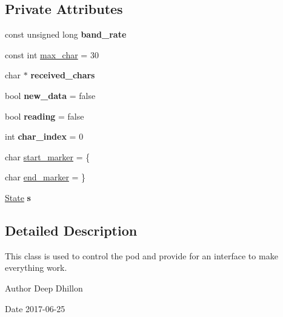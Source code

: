 \subsection*{Private Attributes}
\begin{DoxyCompactItemize}
\item 
\mbox{\label{class_controller_a89b2557ac09f4f69072d2bc92783ba27}} 
const unsigned long {\bfseries band\+\_\+rate}
\item 
const int \hyperlink{class_controller_a5dc336008413ea41127c35433ddb0a5c}{max\+\_\+char} = 30
\item 
\mbox{\label{class_controller_ac646097693f643bafe9abfe72242c95f}} 
char $\ast$ {\bfseries received\+\_\+chars}
\item 
\mbox{\label{class_controller_a77cb6176258765bd019e6ace99a0294a}} 
bool {\bfseries new\+\_\+data} = false
\item 
\mbox{\label{class_controller_a00cc042a5e81aff2fc6324cc6babca3c}} 
bool {\bfseries reading} = false
\item 
\mbox{\label{class_controller_a8c6b4b6bcfa473514e1d62abfd4dfee7}} 
int {\bfseries char\+\_\+index} = 0
\item 
char \hyperlink{class_controller_a2c3ddfae9a818827a9fcb17ea6338a43}{start\+\_\+marker} = \textquotesingle{}\{\textquotesingle{}
\item 
char \hyperlink{class_controller_a4df4acb1afd60491caaa6eb1d056ded7}{end\+\_\+marker} = \textquotesingle{}\}\textquotesingle{}
\item 
\mbox{\label{class_controller_a58930fea277aa5b5bf15fe76bb378475}} 
\hyperlink{class_state}{State} {\bfseries s}
\end{DoxyCompactItemize}


\subsection{Detailed Description}
This class is used to control the pod and provide for an interface to make everything work. 

\begin{DoxyAuthor}{Author}
Deep Dhillon 
\end{DoxyAuthor}
\begin{DoxyDate}{Date}
2017-\/06-\/25 
\end{DoxyDate}


